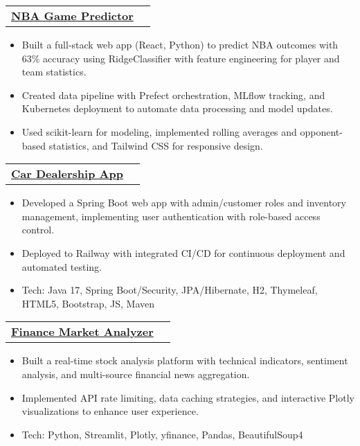\documentclass[10pt, letterpaper]{article}
\makeatletter
\newenvironment{highlights}{
    \begin{itemize}[
        topsep=0.07cm,
        parsep=0.07cm,
        partopsep=0pt,
        itemsep=0pt,
        leftmargin=10pt
    ]
}{
    \end{itemize}
}
\newenvironment{entry}[2]{
    \begin{tabular*}{\textwidth}{@{\extracolsep{\fill}} l r}
        \textbf{#1} & #2 \\
    \end{tabular*}
}{}
\makeatother
\begin{document}
    \begin{entry}{\href{https://nba-predictions-app.vercel.app/}{NBA Game Predictor}}{}
    \end{entry}
    \vspace{-0.35cm}
    \begin{highlights}
        \item Built a full-stack web app (React, Python) to predict NBA outcomes with 63\% accuracy using RidgeClassifier with feature engineering for player and team statistics.
        \item Created data pipeline with Prefect orchestration, MLflow tracking, and Kubernetes deployment to automate data processing and model updates.
        \item Used scikit-learn for modeling, implemented rolling averages and opponent-based statistics, and Tailwind CSS for responsive design.
    \end{highlights}

    \vspace{0.05cm}
    \begin{entry}{\href{https://car-dealership-production-a328.up.railway.app/dealership/}{Car Dealership App}}{}
    \end{entry}
    \vspace{-0.35cm}
    \begin{highlights}
        \item Developed a Spring Boot web app with admin/customer roles and inventory management, implementing user authentication with role-based access control.
        \item Deployed to Railway with integrated CI/CD for continuous deployment and automated testing.
        \item Tech: Java 17, Spring Boot/Security, JPA/Hibernate, H2, Thymeleaf, HTML5, Bootstrap, JS, Maven
    \end{highlights}

    \vspace{0.05cm}
    \begin{entry}{\href{https://finance-tracker-vmp3idcqqmpypq7reczbzp.streamlit.app/}{Finance Market Analyzer}}{}
    \end{entry}
    \vspace{-0.35cm}
    \begin{highlights}
        \item Built a real-time stock analysis platform with technical indicators, sentiment analysis, and multi-source financial news aggregation.
        \item Implemented API rate limiting, data caching strategies, and interactive Plotly visualizations to enhance user experience.
        \item Tech: Python, Streamlit, Plotly, yfinance, Pandas, BeautifulSoup4
    \end{highlights}
\end{document}
